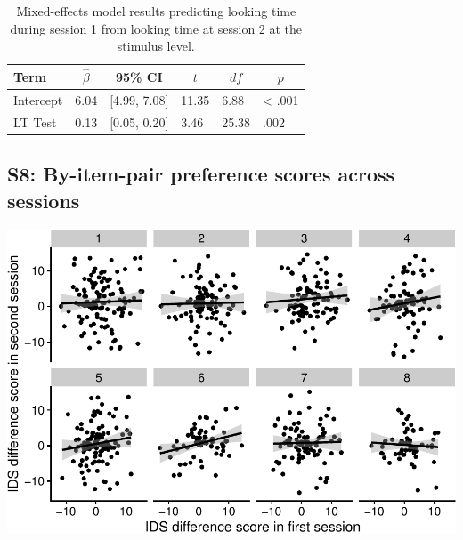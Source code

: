 \documentclass[
  man, donotrepeattitle,floatsintext]{apa6}
\begin{document}
\begin{table}[tbp]

\begin{center}
\begin{threeparttable}

\caption{\label{tab:unnamed-chunk-12}Mixed-effects model results predicting looking time during session 1 from looking time at session 2 at the stimulus level.}

\begin{tabular}{llllll}
\toprule
Term & \multicolumn{1}{c}{$\hat{\beta}$} & \multicolumn{1}{c}{95\% CI} & \multicolumn{1}{c}{$t$} & \multicolumn{1}{c}{$\mathit{df}$} & \multicolumn{1}{c}{$p$}\\
\midrule
Intercept & 6.04 & {}[4.99, 7.08] & 11.35 & 6.88 & < .001\\
LT Test & 0.13 & {}[0.05, 0.20] & 3.46 & 25.38 & .002\\
\bottomrule
\end{tabular}

\end{threeparttable}
\end{center}

\end{table}

\hypertarget{s8-by-item-pair-preference-scores-across-sessions}{%
\subsection{S8: By-item-pair preference scores across sessions}\label{s8-by-item-pair-preference-scores-across-sessions}}

\includegraphics{MB1T_supplement_files/figure-latex/unnamed-chunk-13-1.pdf}
\end{document}
